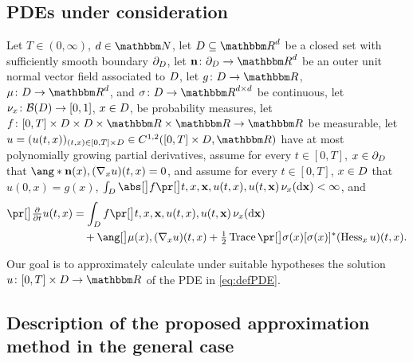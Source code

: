 \subsection{PDEs under consideration}
\label{subsec:gen_pdes}
%
Let
$ T \in (0,\infty) $,
$ d \in \N $,
let
$\D \subseteq \R^d$
be a closed set with sufficiently smooth boundary
$\partial_D$,
let $ \mathbf{n} \colon \partial_\D \to \R^d $ be an outer unit normal vector field associated to $D$,
let
$
g\colon \D \to \R
$,
$
\mu \colon \D \to \R^d
$,
and
$
\sigma \colon \D \to \R^{ d \times d }
$
be
continuous, let
$\nu_x \colon \mathcal{B}(D) \to [0,1]$,
$x \in D$,
be probability measures,
let
$
f \colon [0,T] \times \D \times \D \times \R \times \R
\to \R
$
be measurable,
let
$
u=
(u(t,x))_{(t,x)\in [0,T]\times\D}\in C^{1,2}([0,T]\times\D,\R)
$
have at most polynomially growing partial derivatives, 
assume for every
$t\in [0,T]$,
$x\in \partial_D$
that
$ \ang*{\mathbf{n}(x) ,(\nabla_x u)(t,x)} = 0$,
and assume for every
$t\in [0,T]$,
$x\in D$
that
$u(0,x)=g(x)$,
$\int_\D \babs{f\bpr{t,x,\mathbf{x}, u(t,x),u(t,\mathbf{x})
} } \allowbreak 
\, \nu_x(\diff\mathbf{x}) < \infty$,
and
\begin{equation}
\begin{split}
\bpr{\tfrac{\partial}{\partial t}u}(t,x)
&=
\int_{\D} f\bpr{t,x,\mathbf{x}, u(t,x),u(t,\mathbf{x})
} \, \nu_x(\diff\mathbf{x}) \\
& \quad + \bang{\mu(x), ( \nabla_x u )( t,x ) }
+ \tfrac{ 1 }{ 2 }
\Trace\bpr{
\sigma(x) [ \sigma(x) ]^*
( \Hess_x u)( t,x )
}.
\label{eq:defPDE}
\end{split}
\end{equation}

Our goal is to approximately calculate under suitable hypotheses the solution $u\colon [0,T]\times \D \to \R$ of the PDE in \eqref{eq:defPDE}.
%
%


\subsection{Description of the proposed approximation method in the general case}
\label{subsec:algo-Full-gen}

